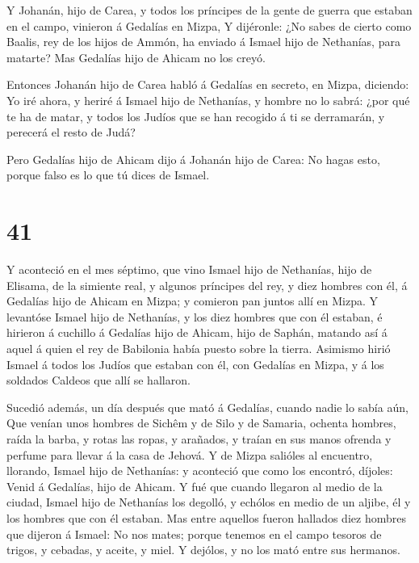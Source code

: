  Y Johanán, hijo de Carea, y todos los príncipes de la
gente de guerra que estaban en el campo, vinieron á Gedalías en Mizpa,
 Y dijéronle: ¿No sabes de cierto como Baalis, rey de los
hijos de Ammón, ha enviado á Ismael hijo de Nethanías, para matarte? Mas
Gedalías hijo de Ahicam no los creyó.

 Entonces Johanán hijo de Carea habló á Gedalías en
secreto, en Mizpa, diciendo: Yo iré ahora, y heriré á Ismael hijo de
Nethanías, y hombre no lo sabrá: ¿por qué te ha de matar, y todos los
Judíos que se han recogido á ti se derramarán, y perecerá el resto de
Judá?

 Pero Gedalías hijo de Ahicam dijo á Johanán hijo de Carea:
No hagas esto, porque falso es lo que tú dices de Ismael.

\hypertarget{section-40}{%
\section{41}\label{section-40}}

 Y aconteció en el mes séptimo, que vino Ismael hijo de
Nethanías, hijo de Elisama, de la simiente real, y algunos príncipes del
rey, y diez hombres con él, á Gedalías hijo de Ahicam en Mizpa; y
comieron pan juntos allí en Mizpa.  Y levantóse Ismael hijo
de Nethanías, y los diez hombres que con él estaban, é hirieron á
cuchillo á Gedalías hijo de Ahicam, hijo de Saphán, matando así á aquel
á quien el rey de Babilonia había puesto sobre la tierra. 
Asimismo hirió Ismael á todos los Judíos que estaban con él, con
Gedalías en Mizpa, y á los soldados Caldeos que allí se hallaron.

 Sucedió además, un día después que mató á Gedalías, cuando
nadie lo sabía aún,  Que venían unos hombres de Sichêm y de
Silo y de Samaria, ochenta hombres, raída la barba, y rotas las ropas, y
arañados, y traían en sus manos ofrenda y perfume para llevar á la casa
de Jehová.  Y de Mizpa salióles al encuentro, llorando,
Ismael hijo de Nethanías: y aconteció que como los encontró, díjoles:
Venid á Gedalías, hijo de Ahicam.  Y fué que cuando llegaron
al medio de la ciudad, Ismael hijo de Nethanías los degolló, y echólos
en medio de un aljibe, él y los hombres que con él estaban. 
Mas entre aquellos fueron hallados diez hombres que dijeron á Ismael: No
nos mates; porque tenemos en el campo tesoros de trigos, y cebadas, y
aceite, y miel. Y dejólos, y no los mató entre sus hermanos.

